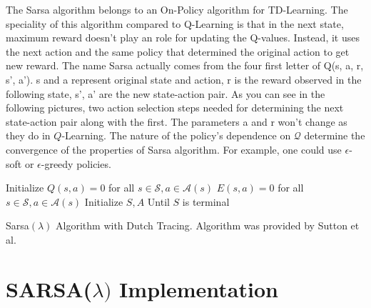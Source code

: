 \documentclass[10pt,conference]{IEEEtran}
\begin{document}
	The Sarsa algorithm belongs to an On-Policy algorithm for TD-Learning. The 
	speciality of this algorithm compared to Q-Learning is that in the next 
	state, maximum reward doesn’t play an role for updating the Q-values. 
	Instead, it uses the next action and the same policy that determined the 
	original action to get new reward. The name Sarsa actually comes from the 
	four first letter of Q(s, a, r, s', a'). s and a represent original state 
	and action, r is the reward observed in the following state, s', a' are 
	the new state-action pair. As you can see in the following pictures, two 
	action selection steps needed for determining the next state-action pair 
	along with the first. The parameters a and r won’t change as they do in 
	\(Q\)-Learning. The nature of the policy's dependence on \(\mathcal{Q}\) determine 
	the convergence of the properties of Sarsa algorithm. For example, one 
	could use \(\epsilon\)-soft or \(\epsilon\)-greedy policies. \cite{sutton18} 
	
	\begin{algorithm}
		\DontPrintSemicolon
		Initialize \(Q(s,a) = 0\) for all \(s \in \mathcal{S}, a \in \mathcal{A}(s)\)\;
		 {
			\(E(s, a) = 0\) for all \(s \in \mathcal{S}, a \in \mathcal{A}(s)\)\;
			Initialize \(S,A\)\;
			Until \(S\) is terminal\;
		}
		\caption{Sarsa\((\lambda)\) Algorithm with Dutch Tracing.  Algorithm
		was provided by Sutton et al. \cite{sutton18}}
		\label{sarsa}
	\end{algorithm}

\section{SARSA(\(\lambda)\) Implementation}
\label{sec:implementation}
\end{document}
